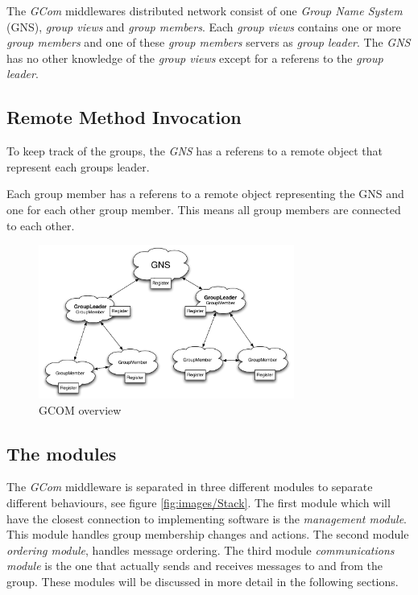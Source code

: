 \documentclass[titlepage, twocolumn, a4paper, 10pt]{article}
\begin{document}
The \textit{GCom} middlewares distributed network consist of one
\textit{Group Name System} (GNS), \textit{group views} and
\textit{group members}. Each \textit{group views} contains
one or more \textit{group members} and one of these
\textit{group members} servers as \textit{group leader}.
The \textit{GNS} has no other knowledge of the \textit{group views}
except for a referens to the \textit{group leader}.

\subsection{Remote Method Invocation}\label{sec:rmi}
To keep track of the groups, the \textit{GNS} has a referens to a
remote object that represent each groups leader.

Each group member has a referens to a remote object representing the
GNS and one for each other group member. This means all group members
are connected to each other.

\begin{figure}[!thb]
  \centering
  \includegraphics[width=3.3in]{images/Overview.pdf}
  \caption{GCOM overview}
  \label{fig:images/overview}
\end{figure}


\subsection{The modules}\label{sec:modules}

The \textit{GCom} middleware is separated in three different modules
to separate different behaviours, see figure \vref{fig:images/Stack}.
The first module which will have the closest connection to
implementing software is the \textit{management module}. This module
handles group membership changes and actions. The second module
\textit{ordering module}, handles message ordering. The third module
\textit{communications module} is the one that actually sends and
receives messages to and from the group. These modules will be
discussed in more detail in the following sections.
\end{document}
